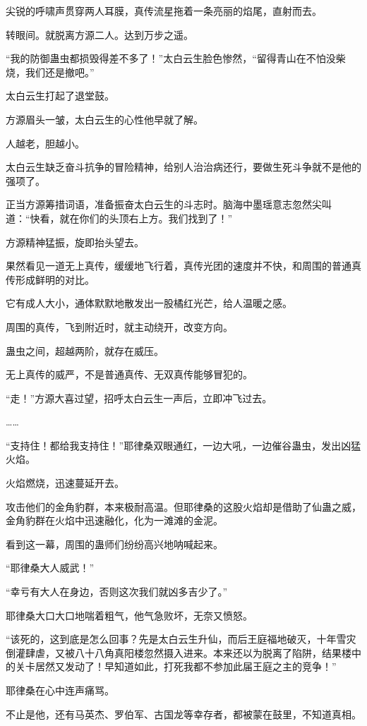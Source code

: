 \begin{this_body}
尖锐的呼啸声贯穿两人耳膜，真传流星拖着一条亮丽的焰尾，直射而去。

转眼间。就脱离方源二人。达到万步之遥。

“我的防御蛊虫都损毁得差不多了！”太白云生脸色惨然，“留得青山在不怕没柴烧，我们还是撤吧。”

太白云生打起了退堂鼓。

方源眉头一皱，太白云生的心性他早就了解。

人越老，胆越小。

太白云生缺乏奋斗抗争的冒险精神，给别人治治病还行，要做生死斗争就不是他的强项了。

正当方源筹措词语，准备振奋太白云生的斗志时。脑海中墨瑶意志忽然尖叫道：“快看，就在你们的头顶右上方。我们找到了！”

方源精神猛振，旋即抬头望去。

果然看见一道无上真传，缓缓地飞行着，真传光团的速度并不快，和周围的普通真传形成鲜明的对比。

它有成人大小，通体默默地散发出一股橘红光芒，给人温暖之感。

周围的真传，飞到附近时，就主动绕开，改变方向。

蛊虫之间，超越两阶，就存在威压。

无上真传的威严，不是普通真传、无双真传能够冒犯的。

“走！”方源大喜过望，招呼太白云生一声后，立即冲飞过去。

……

“支持住！都给我支持住！”耶律桑双眼通红，一边大吼，一边催谷蛊虫，发出凶猛火焰。

火焰燃烧，迅速蔓延开去。

攻击他们的金角豹群，本来极耐高温。但耶律桑的这股火焰却是借助了仙蛊之威，金角豹群在火焰中迅速融化，化为一滩滩的金泥。

看到这一幕，周围的蛊师们纷纷高兴地呐喊起来。

“耶律桑大人威武！”

“幸亏有大人在身边，否则这次我们就凶多吉少了。”

耶律桑大口大口地喘着粗气，他气急败坏，无奈又愤怒。

“该死的，这到底是怎么回事？先是太白云生升仙，而后王庭福地破灭，十年雪灾倒灌肆虐，又被八十八角真阳楼忽然摄入进来。本来还以为脱离了陷阱，结果楼中的关卡居然又发动了！早知道如此，打死我都不参加此届王庭之主的竞争！”

耶律桑在心中连声痛骂。

不止是他，还有马英杰、罗伯军、古国龙等幸存者，都被蒙在鼓里，不知道真相。


\end{this_body}
